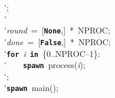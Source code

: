 \'\>;\\

\'\>\\

\'\>\textit{round}~=~[\texttt{\textbf{None}},]~*~NPROC;\\

\'\>\textit{done}~=~[\texttt{\textbf{False}},]~*~NPROC;\\

\'\>\texttt{\textbf{for}}~\textit{i}~\texttt{\textbf{in}}~\{0..NPROC--1\}:\\

\'\>~~~~\texttt{\textbf{spawn}}~process(\textit{i});\\

\'\>;\\

\'\>\texttt{\textbf{spawn}}~main();